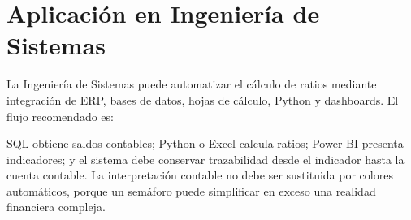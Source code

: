 \section{Aplicación en Ingeniería de Sistemas}
La Ingeniería de Sistemas puede automatizar el cálculo de ratios mediante integración de ERP, bases de datos, hojas de cálculo, Python y dashboards. El flujo recomendado es:

\begin{center}
\end{center}

SQL obtiene saldos contables; Python o Excel calcula ratios; Power BI presenta indicadores; y el sistema debe conservar trazabilidad desde el indicador hasta la cuenta contable. La interpretación contable no debe ser sustituida por colores automáticos, porque un semáforo puede simplificar en exceso una realidad financiera compleja.
